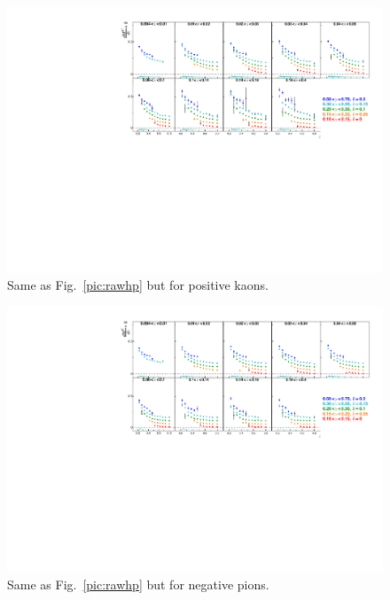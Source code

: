 \newpage

\begin{figure}[!h]
  \includegraphics[scale=0.85]{./gfx/rawkp.pdf}
  \caption{Same as Fig.~\ref{pic:rawhp} but for positive kaons.}
  \label{pic:rawkp}
\end{figure}

\begin{figure}[!h]
  \includegraphics[scale=0.85]{./gfx/rawkm.pdf}
  \caption{Same as Fig.~\ref{pic:rawhp} but for negative pions.}
  \label{pic:rawkm}
\end{figure}

\newpage

